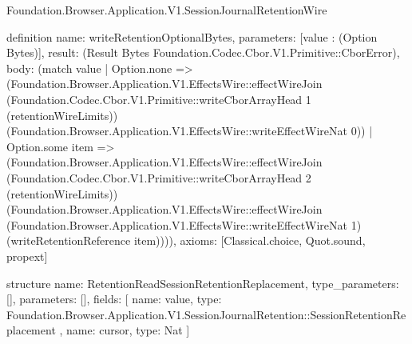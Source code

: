 \begin{lexlean}{Foundation.Browser.Application.V1.SessionJournalRetentionWire}
\begin{semanticmodule}
definition{
  name: writeRetentionOptionalBytes,
  parameters: [value : (Option Bytes)],
  result: (Result Bytes Foundation.Codec.Cbor.V1.Primitive::CborError),
  body: (match value
    | Option.none => (Foundation.Browser.Application.V1.EffectsWire::effectWireJoin (Foundation.Codec.Cbor.V1.Primitive::writeCborArrayHead 1 (retentionWireLimits)) (Foundation.Browser.Application.V1.EffectsWire::writeEffectWireNat 0))
    | Option.some item => (Foundation.Browser.Application.V1.EffectsWire::effectWireJoin (Foundation.Codec.Cbor.V1.Primitive::writeCborArrayHead 2 (retentionWireLimits)) (Foundation.Browser.Application.V1.EffectsWire::effectWireJoin (Foundation.Browser.Application.V1.EffectsWire::writeEffectWireNat 1) (writeRetentionReference item)))),
  axioms: [Classical.choice, Quot.sound, propext]
}

structure{
  name: RetentionReadSessionRetentionReplacement,
  type_parameters: [],
  parameters: [],
  fields: [
    {
      name: value,
      type: Foundation.Browser.Application.V1.SessionJournalRetention::SessionRetentionReplacement
    },
    {name: cursor, type: Nat}
  ]
}


\end{semanticmodule}
\end{lexlean}
